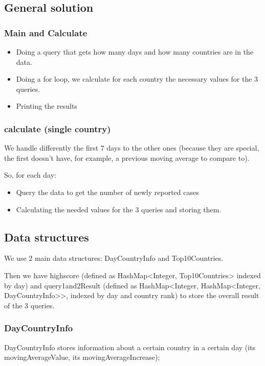 \documentclass[table, 12pt]{article}
\begin{document}
\subsection{General solution}
\subsubsection{Main and Calculate}

\begin{itemize}
\setlength\itemsep{-0.5em}
\item Doing a query that gets how many days and how many countries are in the data.
\item Doing a for loop, we calculate for each country the necessary values for the 3 queries.
\item Printing the results
\end{itemize}

\subsubsection{calculate (single country)}

We handle differently the first 7 days to the other ones (because they are special, the first doesn’t have, for example, a previous moving average to compare to).

So, for each day:

\begin{itemize}
\setlength\itemsep{-0.5em}
\item Query the data to get the number of newly reported cases
\item Calculating the needed values for the 3 queries and storing them.
\end{itemize}

\subsection{Data structures}
We use 2 main data structures: DayCountryInfo and Top10Countries.

Then we have highscore (defined as HashMap<Integer, Top10Countries> indexed by day) and query1and2Result (defined as HashMap<Integer, HashMap<Integer, DayCountryInfo>>, indexed by day and country rank) to store the overall result of the 3 queries.

\subsubsection{DayCountryInfo}
DayCountryInfo stores information about a certain country in a certain day (its movingAverageValue, its movingAverageIncrease);
\end{document}
